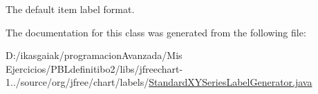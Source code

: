 The default item label format. 

The documentation for this class was generated from the following file\+:\begin{DoxyCompactItemize}
\item 
D\+:/ikasgaiak/programacion\+Avanzada/\+Mis Ejercicios/\+P\+B\+Ldefinitibo2/libs/jfreechart-\/1../source/org/jfree/chart/labels/\mbox{\hyperlink{_standard_x_y_series_label_generator_8java}{Standard\+X\+Y\+Series\+Label\+Generator.\+java}}\end{DoxyCompactItemize}
